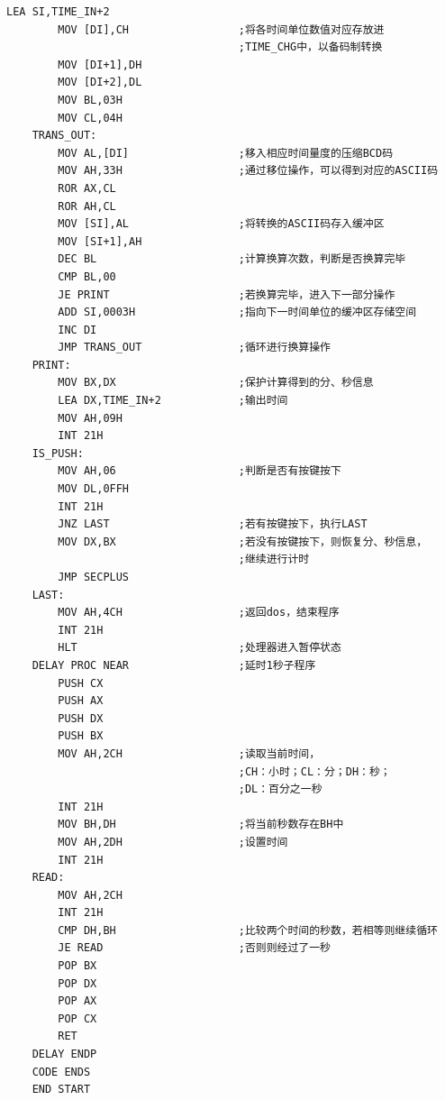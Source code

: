 \documentclass[11pt]{SEU-Digital-Report}
\begin{document}
\begin{lstlisting}[language={[x86masm]Assembler},title=CLK]
        LEA SI,TIME_IN+2
        MOV [DI],CH                 ;将各时间单位数值对应存放进
                                    ;TIME_CHG中，以备码制转换
        MOV [DI+1],DH
        MOV [DI+2],DL
        MOV BL,03H
        MOV CL,04H
    TRANS_OUT:
        MOV AL,[DI]                 ;移入相应时间量度的压缩BCD码
        MOV AH,33H                  ;通过移位操作，可以得到对应的ASCII码
        ROR AX,CL
        ROR AH,CL
        MOV [SI],AL                 ;将转换的ASCII码存入缓冲区
        MOV [SI+1],AH
        DEC BL                      ;计算换算次数，判断是否换算完毕
        CMP BL,00
        JE PRINT                    ;若换算完毕，进入下一部分操作
        ADD SI,0003H                ;指向下一时间单位的缓冲区存储空间
        INC DI
        JMP TRANS_OUT               ;循环进行换算操作
    PRINT: 
        MOV BX,DX                   ;保护计算得到的分、秒信息
        LEA DX,TIME_IN+2            ;输出时间
        MOV AH,09H
        INT 21H
    IS_PUSH: 
        MOV AH,06                   ;判断是否有按键按下
        MOV DL,0FFH       
        INT 21H
        JNZ LAST                    ;若有按键按下，执行LAST
        MOV DX,BX                   ;若没有按键按下，则恢复分、秒信息，
                                    ;继续进行计时
        JMP SECPLUS           
    LAST:
        MOV AH,4CH                  ;返回dos，结束程序
        INT 21H
        HLT                         ;处理器进入暂停状态
    DELAY PROC NEAR                 ;延时1秒子程序     
        PUSH CX
        PUSH AX
        PUSH DX
        PUSH BX
        MOV AH,2CH                  ;读取当前时间，
                                    ;CH：小时；CL：分；DH：秒；
                                    ;DL：百分之一秒
        INT 21H
        MOV BH,DH                   ;将当前秒数存在BH中
        MOV AH,2DH                  ;设置时间
        INT 21H
    READ:
        MOV AH,2CH
        INT 21H
        CMP DH,BH                   ;比较两个时间的秒数，若相等则继续循环
        JE READ                     ;否则则经过了一秒
        POP BX
        POP DX
        POP AX
        POP CX
        RET
    DELAY ENDP
    CODE ENDS
    END START
\end{lstlisting}
\end{document}
